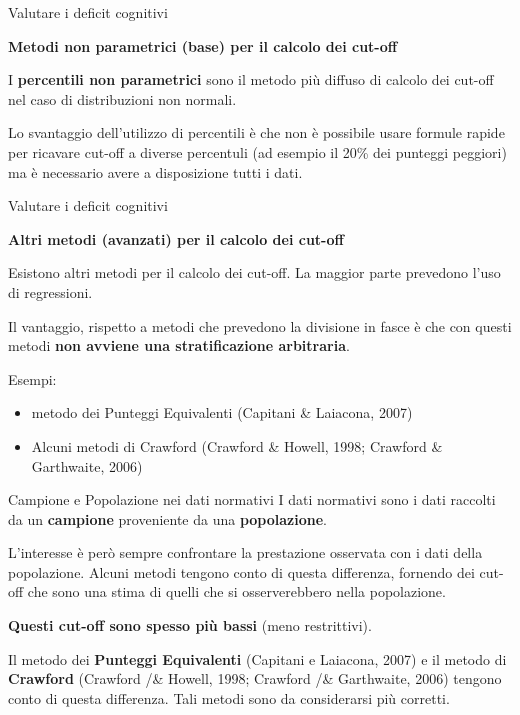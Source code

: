 \documentclass[
  ignorenonframetext,
]{beamer}
\begin{document}
\begin{frame}{Valutare i deficit cognitivi}
\label{valutare-i-deficit-cognitivi-12}
\begin{center}
  \textbf{Metodi non parametrici (base) per il calcolo dei cut-off}
\end{center}
\vspace{2em}

I \textbf{percentili non parametrici} sono il metodo più diffuso di
calcolo dei cut-off nel caso di distribuzioni non normali.

Lo svantaggio dell'utilizzo di percentili è che non è possibile usare
formule rapide per ricavare cut-off a diverse percentuli (ad esempio il
20\% dei punteggi peggiori) ma è necessario avere a disposizione tutti i
dati.
\end{frame}

\begin{frame}{Valutare i deficit cognitivi}
\label{valutare-i-deficit-cognitivi-13}
\begin{center}
  \textbf{Altri metodi (avanzati) per il calcolo dei cut-off}
\end{center}
\vspace{1em}

Esistono altri metodi per il calcolo dei cut-off. La maggior parte
prevedono l'uso di regressioni.

Il vantaggio, rispetto a metodi che prevedono la divisione in fasce è
che con questi metodi \textbf{non avviene una stratificazione
arbitraria}.

Esempi:

\begin{itemize}
\item
  metodo dei Punteggi Equivalenti (Capitani \& Laiacona, 2007)
\item
  Alcuni metodi di Crawford (Crawford \& Howell, 1998; Crawford \&
  Garthwaite, 2006)
\end{itemize}
\end{frame}

\begin{frame}{Campione e Popolazione nei dati normativi}
\label{campione-e-popolazione-nei-dati-normativi}
I dati normativi sono i dati raccolti da un \textbf{campione}
proveniente da una \textbf{popolazione}.

L'interesse è però sempre confrontare la prestazione osservata con i
dati della popolazione. Alcuni metodi tengono conto di questa
differenza, fornendo dei cut-off che sono una stima di quelli che si
osserverebbero nella popolazione.

\textbf{Questi cut-off sono spesso più bassi} (meno restrittivi).

Il metodo dei \textbf{Punteggi Equivalenti} (Capitani e Laiacona, 2007)
e il metodo di \textbf{Crawford} (Crawford /\& Howell, 1998; Crawford
/\& Garthwaite, 2006) tengono conto di questa differenza. Tali metodi
sono da considerarsi più corretti.
\end{frame}
\end{document}
